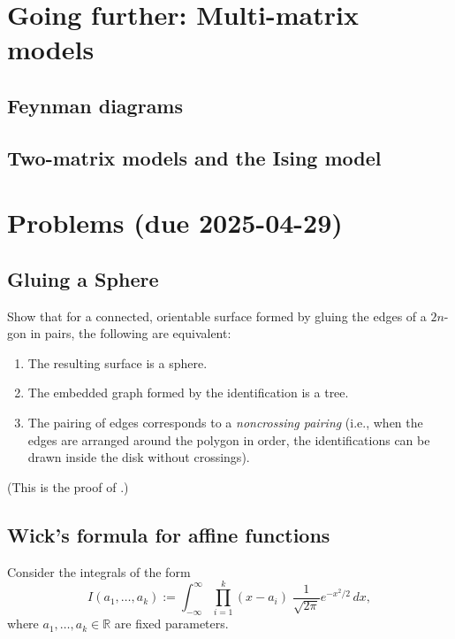 \documentclass[letterpaper,11pt,oneside,reqno]{article}
\numberwithin{equation}{section}
\theoremstyle{definition}
\begin{document}
\section{Going further: Multi-matrix models}


\subsection{Feynman diagrams}

\subsection{Two-matrix models and the Ising model}




























\appendix
\setcounter{section}{14}

\section{Problems (due 2025-04-29)}

\subsection{Gluing a Sphere}
\label{prob:gluing_sphere}
Show that for a connected, orientable surface formed by gluing the edges of a $2n$-gon in pairs, the following are equivalent:
\begin{enumerate}
	\item The resulting surface is a sphere.
	\item The embedded graph formed by the identification is a tree.
	\item The pairing of edges corresponds to a \emph{noncrossing pairing} (i.e., when the edges are arranged around the polygon in order, the identifications can be drawn inside the disk without crossings).
\end{enumerate}
(This is the proof of .)

\subsection{Wick's formula for affine functions}
\label{prob:wick-linear}
Consider the integrals of the form
\[
	I(a_1, \ldots, a_k) := \int_{-\infty}^\infty \prod_{i=1}^k (x - a_i)\; \frac{1}{\sqrt{2\pi}} e^{-x^2/2}\, dx,
\]
where $a_1, \ldots, a_k \in \mathbb{R}$ are fixed parameters.
\end{document}
